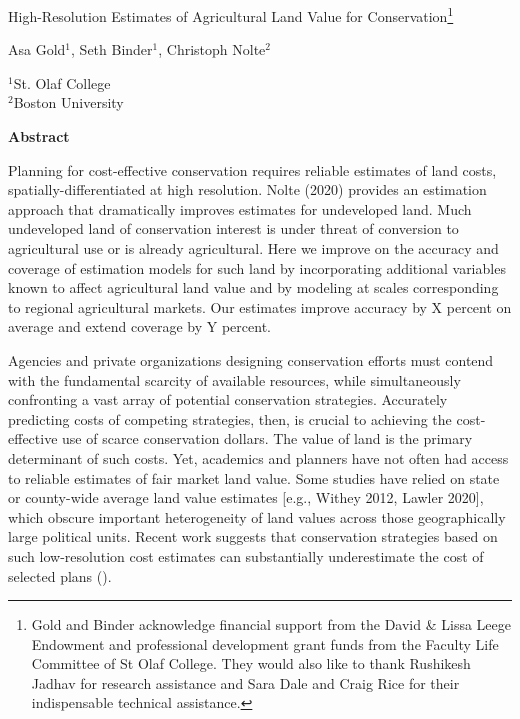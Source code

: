 \documentclass[12pt]{article}
\begin{document}
\hspace{5pt}

\Large
 \begin{center}
High-Resolution Estimates of Agricultural Land Value for Conservation\footnote[2]{Gold and Binder acknowledge financial support from the David \& Lissa Leege Endowment and professional development grant funds from the Faculty Life Committee of St Olaf College. They would also like to thank Rushikesh Jadhav for research assistance and Sara Dale and Craig Rice for their indispensable technical assistance.}\\ 

\vspace{10pt}

\large
Asa Gold$^1$, Seth Binder$^1$, Christoph Nolte$^2$ \\

\vspace{10pt}

\footnotesize  
$^{1}$St. Olaf College\\
$^2$Boston University

\vspace{40pt} 

    \normalsize
    \textbf{Abstract}
\end{center}

\small
Planning for cost-effective conservation requires reliable estimates of land costs, spatially-differentiated at high resolution. Nolte (2020) provides an estimation approach that dramatically improves estimates for undeveloped land. Much undeveloped land of conservation interest is under threat of conversion to agricultural use or is already agricultural. Here we improve on the accuracy and coverage of estimation models for such land by incorporating additional variables known to affect agricultural land value and by modeling at scales corresponding to regional agricultural markets. Our estimates improve accuracy by X percent on average and extend coverage by Y percent. 

\newpage

Agencies and private organizations designing conservation efforts must contend with the fundamental scarcity of available resources, while simultaneously confronting a vast array of potential conservation strategies. Accurately predicting costs of competing strategies, then, is crucial to achieving the cost-effective use of scarce conservation dollars. The value of land is the primary determinant of such costs. Yet, academics and planners have not often had access to reliable estimates of fair market land value. Some studies have relied on state or county-wide average land value estimates [e.g., Withey 2012, Lawler 2020], which obscure important heterogeneity of land values across those geographically large political units. Recent work suggests that conservation strategies based on such low-resolution cost estimates can substantially underestimate the cost of selected plans (\cite{Nolte2020High-resolutionStates}). 
\end{document}
